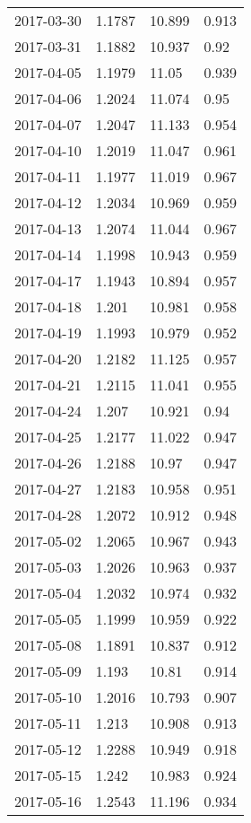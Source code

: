 \begin{center}
\begin{longtable}{r lll}
    2017-03-30 & 1.1787 & 10.899 & 0.913  \\
    2017-03-31 & 1.1882 & 10.937 & 0.92   \\
    2017-04-05 & 1.1979 & 11.05  & 0.939  \\
    2017-04-06 & 1.2024 & 11.074 & 0.95   \\
    2017-04-07 & 1.2047 & 11.133 & 0.954  \\
    2017-04-10 & 1.2019 & 11.047 & 0.961  \\
    2017-04-11 & 1.1977 & 11.019 & 0.967  \\
    2017-04-12 & 1.2034 & 10.969 & 0.959  \\
    2017-04-13 & 1.2074 & 11.044 & 0.967  \\
    2017-04-14 & 1.1998 & 10.943 & 0.959  \\
    2017-04-17 & 1.1943 & 10.894 & 0.957  \\
    2017-04-18 & 1.201  & 10.981 & 0.958  \\
    2017-04-19 & 1.1993 & 10.979 & 0.952  \\
    2017-04-20 & 1.2182 & 11.125 & 0.957  \\
    2017-04-21 & 1.2115 & 11.041 & 0.955  \\
    2017-04-24 & 1.207  & 10.921 & 0.94   \\
    2017-04-25 & 1.2177 & 11.022 & 0.947  \\
    2017-04-26 & 1.2188 & 10.97  & 0.947  \\
    2017-04-27 & 1.2183 & 10.958 & 0.951  \\
    2017-04-28 & 1.2072 & 10.912 & 0.948  \\
    2017-05-02 & 1.2065 & 10.967 & 0.943  \\
    2017-05-03 & 1.2026 & 10.963 & 0.937  \\
    2017-05-04 & 1.2032 & 10.974 & 0.932  \\
    2017-05-05 & 1.1999 & 10.959 & 0.922  \\
    2017-05-08 & 1.1891 & 10.837 & 0.912  \\
    2017-05-09 & 1.193  & 10.81  & 0.914  \\
    2017-05-10 & 1.2016 & 10.793 & 0.907  \\
    2017-05-11 & 1.213  & 10.908 & 0.913  \\
    2017-05-12 & 1.2288 & 10.949 & 0.918  \\
    2017-05-15 & 1.242  & 10.983 & 0.924  \\
    2017-05-16 & 1.2543 & 11.196 & 0.934  \\

\end{longtable}
\end{center}
